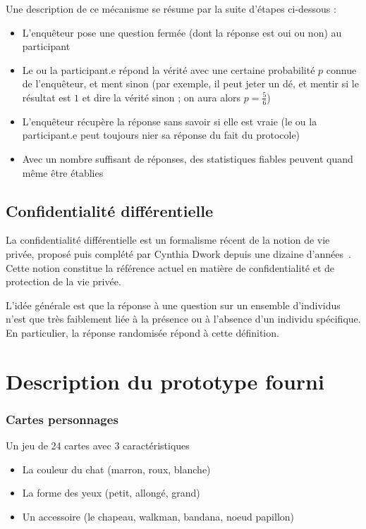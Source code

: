 \documentclass[a4paper, 12pt]{article}
\begin{document}
Une description de ce mécanisme se résume par la suite d'étapes ci-dessous :
\begin{itemize}
	\item L'enquêteur pose une question fermée (dont la réponse est oui ou non) au participant
	\item Le ou la participant.e répond la vérité avec une certaine probabilité $p$ connue de l'enquêteur, et ment sinon (par exemple, il peut jeter un dé, et mentir si le résultat est $1$ et dire la vérité sinon ; on aura alors $p=\frac{5}{6}$)
	\item L'enquêteur récupère la réponse sans savoir si elle est vraie (le ou la participant.e peut toujours nier sa réponse du fait du protocole)
	\item Avec un nombre suffisant de réponses, des statistiques fiables peuvent quand même être établies
\end{itemize}

\subsection*{Confidentialité différentielle}

La confidentialité différentielle est un formalisme récent de la notion de vie privée, proposé puis complété par Cynthia Dwork depuis une dizaine d'années~\cite{TCS-042,differential-privacy}.
Cette notion constitue la référence actuel en matière de confidentialité et de protection de la vie privée.

L'idée générale est que la réponse à une question sur un ensemble d'individus n'est que très faiblement liée à la présence ou à l'absence d'un individu spécifique.
En particulier, la réponse randomisée répond à cette définition.

\newpage
\section*{Description du prototype fourni}


\subsubsection*{Cartes personnages}
Un jeu de 24 cartes avec 3 caractéristiques
\begin{itemize}
\item La couleur du chat (marron, roux, blanche)
\item La forme des yeux (petit, allongé, grand)
\item Un accessoire (le chapeau, walkman, bandana, noeud papillon)
\end{itemize}
\end{document}
